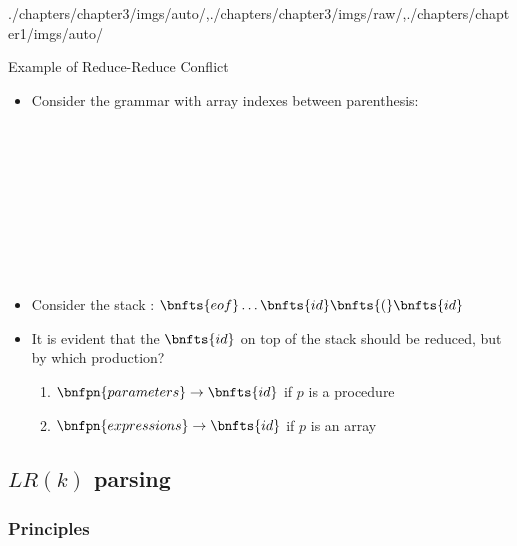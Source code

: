 \begin{graphicspathcontext}{{./chapters/chapter3/imgs/auto/},{./chapters/chapter3/imgs/raw/},{./chapters/chapter1/imgs/auto/}}
\begin{bibunit}[apalike]
\begin{frame}[t]{Example of Reduce-Reduce Conflict}	
	\begin{itemize}
	\item Consider the grammar with array indexes between parenthesis:
		\begin{footnotesize}\begin{bnf}
			 \\
			 \\
			 \\
			 \\
			 \\
			 \\
			 \\
			 \\
		\end{bnf}\end{footnotesize}
	\vspace{-.75cm}
	\item Consider the stack : $\bnfts{eof} \dots \bnfts{id} \bnfts{(} \bnfts{id}$
	\item It is evident that the $\bnfts{id}$ on top of the stack should be reduced, but by which production?
		\begin{enumerate}
		\item $\bnfpn{parameters} \bnfopo \bnfts{id}$ if $p$ is a procedure
		\item $\bnfpn{expressions} \bnfopo \bnfts{id}$ if $p$ is an array
		\end{enumerate}
	\end{itemize}
\end{frame}

\subsection{$LR(k)$ parsing}
\subsectiontableofcontentslide*

\subsubsection{Principles}


\end{bibunit}
\end{graphicspathcontext}
